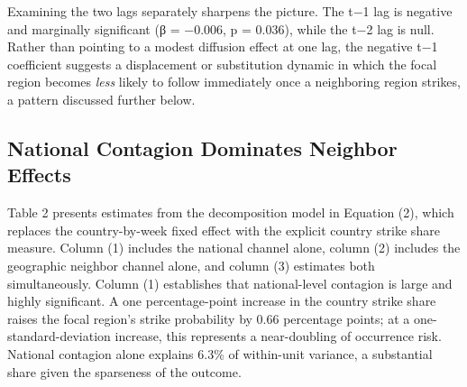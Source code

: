 \documentclass[
  11pt,
]{article}
\begin{document}
\par\endgroup

Examining the two lags separately sharpens the picture. The t−1 lag is
negative and marginally significant (β = −0.006, p = 0.036), while the
t−2 lag is null. Rather than pointing to a modest diffusion effect at
one lag, the negative t−1 coefficient suggests a displacement or
substitution dynamic in which the focal region becomes \emph{less}
likely to follow immediately once a neighboring region strikes, a
pattern discussed further below.

\subsection{National Contagion Dominates Neighbor
Effects}\label{national-contagion-dominates-neighbor-effects}

Table 2 presents estimates from the decomposition model in Equation (2),
which replaces the country-by-week fixed effect with the explicit
country strike share measure. Column (1) includes the national channel
alone, column (2) includes the geographic neighbor channel alone, and
column (3) estimates both simultaneously. Column (1) establishes that
national-level contagion is large and highly significant. A one
percentage-point increase in the country strike share raises the focal
region's strike probability by 0.66 percentage points; at a
one-standard-deviation increase, this represents a near-doubling of
occurrence risk. National contagion alone explains 6.3\% of within-unit
variance, a substantial share given the sparseness of the outcome.
\end{document}
